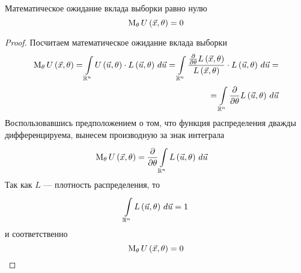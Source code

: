 \begin{lemma}\label{remark:expectationU}
  Математическое ожидание вклада выборки равно нулю
  \begin{equation*}
    \meanof{\theta}{U\left( \vec{x}, \theta \right)} = 0
  \end{equation*}
\end{lemma}
\begin{proof}
Посчитаем математическое ожидание вклада выборки
\begin{align*}
  \meanof{\theta}{U\left( \vec{x}, \theta \right)}
    = \integral{\mathbb{R}^n}{}{\vec{u}}
      {U\left( \vec{u}, \theta \right)
        \cdot L\left( \vec{u}, \theta \right)}
    = \integral{\mathbb{R}^n}{}{\vec{u}}
      {\frac{\frac{\partial}{\partial\theta}L\left(\vec{x}, \theta\right)}
        {L\left(\vec{x}, \theta\right)}
        \cdot L\left( \vec{u}, \theta \right)} = \\
    = \integral{\mathbb{R}^n}{}{\vec{u}}{\frac{\partial}{\partial\theta}
      L\left( \vec{u}, \theta \right)}
\end{align*}
Воспользовавшись предположением о том,
что функция распределения дважды дифференцируема,
вынесем производную за знак интеграла
\begin{align*}
  \meanof{\theta}{U\left( \vec{x},\theta \right)}
    &= \frac{\partial}{\partial\theta}
      \integral{\mathbb{R}^n}{}{\vec{u}}{L\left( \vec{u},\theta \right)}
\end{align*}
Так как $L$ --- плотность распределения, то
\begin{equation*}
  \integral{\mathbb{R}^n}{}{\vec{u}}{L\left( \vec{u}, \theta \right)} = 1
\end{equation*}
и соответственно
\begin{equation*}
  \meanof{\theta}{U\left( \vec{x}, \theta \right)} = 0
\end{equation*}
\end{proof}

\begin{comment}
\begin{remark}\label{remark:partialLikelihoodNull}
  Частная производная по параметру $\theta$ от функции правдоподобия
  $L\left( \vec{u},\theta \right)$ равна нулю.
\end{remark}
\begin{proof}
  Выше у нас было равенство
  $$\frac{\partial}{\partial\theta}
    \integral{\mathbb{R}^n}{}{\vec{u}}{L\left( \vec{u},\theta \right)}=0$$

  Так как производную можем заносить под знак интеграла
  (согласно замечанию \ref{remark:doubleDiff}), то получаем такое равенство
  $$\integral{\mathbb{R}^n}{}{\vec{u}}{
    \frac{\partial}{\partial\theta}L\left( \vec{u},\theta \right)}=0$$

  Поскольку интеграл не зависит от $\theta$,
  то такое возможно лишь в том случае, когда производная равна нулю
  $$\frac{\partial}{\partial\theta}L\left( \vec{u},\theta \right)=0$$
\end{proof}
\end{comment}

